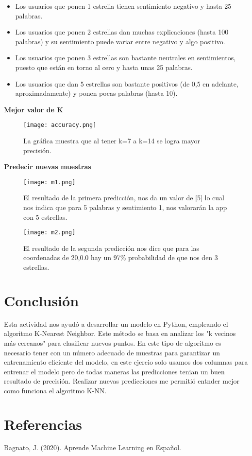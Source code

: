 \documentclass{article}
\begin{document}
\begin{itemize}
    \item Los usuarios que ponen 1 estrella tienen sentimiento negativo y hasta 25 palabras.
    \item Los usuarios que ponen 2 estrellas dan muchas explicaciones (hasta 100 palabras) y su sentimiento puede variar entre negativo y algo positivo.
    \item Los usuarios que ponen 3 estrellas son bastante neutrales en sentimientos, puesto que están en torno al cero y hasta unas 25 palabras.
    \item Los usuarios que dan 5 estrellas son bastante positivos (de 0,5 en adelante, aproximadamente) y ponen pocas palabras (hasta 10).
\end{itemize}


\textbf{Mejor valor de K}


\begin{figure}[H]
    \centering
    \texttt{[image: accuracy.png]}
    \caption{{\small La gráfica muestra que al tener k=7 a k=14 se logra mayor precisión.}}
    \label{figura10}
\end{figure}


\textbf{Predecir nuevas muestras}

\begin{figure}[H]
    \centering
    \texttt{[image: m1.png]}
    \caption{{\small El resultado de la primera predicción, nos da un valor de [5] lo cual nos indica que para 5 palabras y sentimiento 1, nos valorarán la app con 5 estrellas.}}
    \label{figura11}
\end{figure}

\begin{figure}[H]
    \centering
    \texttt{[image: m2.png]}
    \caption{{\small El resultado de la segunda predicción nos dice que para las coordenadas de 20,0.0 hay un 97\% probabilidad de que nos den 3 estrellas.}}
    \label{figura12}
\end{figure}


\section{Conclusión}
Esta actividad nos ayudó a desarrollar un modelo en Python, empleando el algoritmo K-Nearest Neighbor. Este método se basa en analizar los "k vecinos más cercanos" para clasificar nuevos puntos. En este tipo de algoritmo es necesario  tener con un número adecuado de muestras para garantizar un entrenamiento eficiente del modelo, en este ejercio solo usamos dos columnas para entrenar el modelo pero de todas maneras las predicciones tenian un buen resultado de precisión. Realizar nuevas predicciones me permitió entnder mejor como funciona el algoritmo K-NN.

\section{Referencias}
Bagnato, J. (2020). Aprende Machine Learning en Español.
\end{document}
